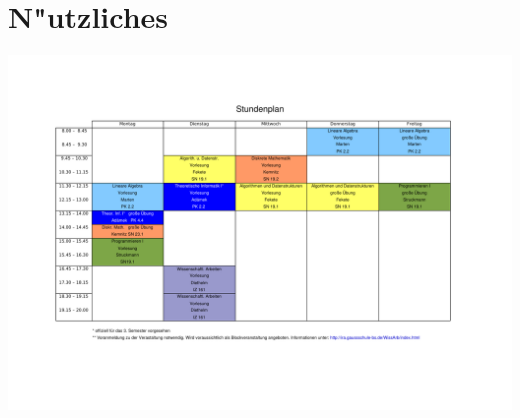 \section{N"utzliches}


\newpage
\includegraphics[angle=90,totalheight=\textheight,width=1.25\textwidth]
{texte/nuetzliches/stundenplan.pdf}
